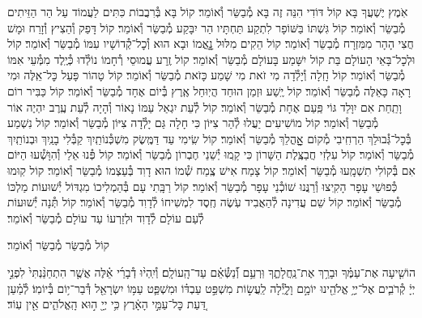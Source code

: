 \documentclass[twoside, openany, parskip=half, 11pt]{book}
\begin{document}
\begin{small}
אֹֽמֶץ יֶשְׁעֲךָ בָּא קוֹל דּוֹדִי הִנֵּה זֶה בָּא מְ֯בַשֵּׂר וְ֯אוֹמֵר׃
קוֹל בָּא בְּ֯רִבֲבוֹת כִּתִּים לַעֲמוֹד עַל הַר הַזֵּיתִים מְ֯בַשֵּׂר וְ֯אוֹמֵר׃
קוֹל גִּשְׁתּוֹ בַּשּׁוֹפָר לִתְקַע תַּחְתָּיו הַר יִבָּקַע מְ֯בַשֵּׂר וְ֯אוֹמֵר׃
קוֹל דָּפַק וְ֯הֵצִיץ וְ֯זָרַח וּמָשׁ חֲצִי הָהָר מִמִּזְרָח מְ֯בַשֵּׂר וְ֯אוֹמֵר׃
קוֹל הֵקִים מִלּוּל נׇׇׇאֳמוֹ וּבָא הוּא וְ֯כׇל־קְ֯דוֹשָׁיו עִמּוֹ מְ֯בַשֵּׂר וְ֯אוֹמֵר׃
קוֹל וּלְכׇל־בָּאֵי הָעוֹלָם בַּת קוֹל יִשָּׁמַע בָּעוֹלָם מְ֯בַשֵּׂר וְ֯אוֹמֵר׃
קוֹל זֶֽרַע עֲמוּסֵי רְ֯חָמוֹ נוֹלְ֯דוּ כְּ֯יֶֽלֶד מִמְּ֯עֵי אִמּוֹ מְ֯בַשֵּׂר וְ֯אוֹמֵר׃
קוֹל חָֽלָה וְ֯יָלְ֯דָה מִי זֹאת מִי שָׁמַע כָּזֹאת מְ֯בַשֵּׂר וְ֯אוֹמֵר׃
קוֹל טָהוֹר פָּעַל כׇּל־אֵֽלֶּה וּמִי רָאָה כָּאֵלֶּה מְ֯בַשֵּׂר וְ֯אוֹמֵר׃
קוֹל יֶֽשַׁע וּזְמַן הוּחַד הֲיֽוּחַל אֶֽרֶץ בְּ֯יוֹם אֶחָד מְ֯בַשֵּׂר וְ֯אוֹמֵר׃
קוֹל כַּבִּיר רוֹם וָתַֽחַת אִם יִוָּלֵד גּוֹי פַּֽעַם אֶחָת מְ֯בַשֵּׂר וְ֯אוֹמֵר׃
קוֹל לְ֯עֵת יִגְאַל עַמּוֹ נָאוֹר וְ֯הָיָה לְ֯עֵת עֶֽרֶב יִהְיֶה אוֹר מְ֯בַשֵּׂר וְ֯אוֹמֵר׃
קוֹל מוֹשִׁיעִים יַעֲלוּ לְ֯הַר צִיּוֹן כִּי חָלָה גַּם יָלְ֯דָה צִיּוֹן מְ֯בַשֵּׂר וְ֯אוֹמֵר׃
קוֹל נִשְׁמַע בְּ֯כׇל־גְּ֯בוּלֵךְ הַרְחִֽיבִי מְ֯קוֹם אׇׇׇׇׇהֳלֵךְ מְ֯בַשֵּׂר וְ֯אוֹמֵר׃
קוֹל שִֽׂימִי עַד דַּמֶּֽשֶׂק מִשְׁכְּ֯נוֹתַֽיִךְ קַבְּ֯לִי בָנַֽיִךְ וּבְנוֹתַֽיִךְ מְ֯בַשֵּׂר וְ֯אוֹמֵר׃
קוֹל עִלְזִי חֲבַצֶּֽלֶת הַשָּׁרוֹן כִּי קָֽמוּ יְ֯שֵׁנֵי חֶבְרוֹן מְ֯בַשֵּׂר וְ֯אוֹמֵר׃
קוֹל פְּ֯נוּ אֵלַי וְ֯הִוָּשְׁ֯עוּ הַיּוֹם אִם בְּ֯קוֹלִי תִשְׁמָֽעוּ מְ֯בַשֵּׂר וְ֯אוֹמֵר׃
קוֹל צָמַח אִישׁ צֶֽמַח שְׁ֯מוֹ הוּא דָוִד בְּ֯עַצְמוֹ מְ֯בַשֵּׂר וְ֯אוֹמֵר׃
קוֹל קֽוּמוּ כְּ֯פוּשֵׁי עָפָר הָקִֽיצוּ וְ֯רַנֲּנוּ שׁוֹכְ֯נֵי עָפָר מְ֯בַשֵּׂר וְ֯אוֹמֵר׃
קוֹל רַבָּֽתִי עָם בְּ֯הַמְלִיכוֹ מִגְדּוֹל יְ֯שׁוּעוֹת מַלְכּוֹ מְ֯בַשֵּׂר וְ֯אוֹמֵר׃
קוֹל שֵׁם עֲדִינָה לְ֯הַאֲבִיד עֹֽשֶׂה חֶֽסֶד לִמְשִׁיחוֹ לְ֯דָוִד מְ֯בַשֵּׂר וְ֯אוֹמֵר׃
קוֹל תְּ֯נָה יְ֯שׁוּעוֹת לְ֯עַם עוֹלָם לְ֯דָוִד וּלְזַרְעוֹ עַד עוֹלָם מְ֯בַשֵּׂר וְ֯אוֹמֵר׃

\end{small}

\begin{large}
קוֹל מְ֯בַשֵּׂר מְ֯בַשֵּׂר וְ֯אוֹמֵר׃

\end{large}

הוֹשִׁ֤יעָה אֶת־עַמֶּ֗ךָ וּבָרֵ֥ךְ אֶת־נַֽחֲלָתֶ֑ךָ וּֽרְעֵ֥ם וְ֯֝נַשְּׂ֯אֵ֗ם עַד־הָֽעוֹלָֽם׃ וְ֯יִֽהְי֨וּ דְ֯בָרַ֜י אֵ֗לֶּה אֲשֶׁ֤ר הִתְחַנַּ֨נְתִּי֙ לִפְנֵ֣י יְיָ֔ קְ֯רֹבִ֛ים אֶל־יְיָ֥ אֱלֹהֵ֖ינוּ יוֹמָ֣ם וָלָ֑יְ֯לָה לַֽעֲשׂ֣וֹת מִשְׁפַּ֣ט עַבְדּ֗וֹ וּמִשְׁפַּ֛ט עַמּ֥וֹ יִשְׂרָאֵ֖ל דְּ֯בַר־י֥וֹם בְּ֯יוֹמֽוֹ׃ לְ֯מַ֗עַן דַּ֚עַת כׇּל־עַמֵּ֣י הָאָ֔רֶץ כִּ֥י יְיָ֖ ה֣וּא הָֽאֱלֹהִ֑ים אֵ֖ין עֽוֹד׃

\end{document}
